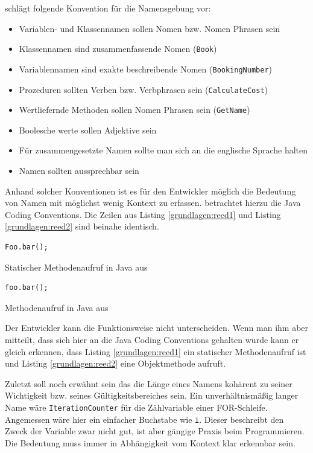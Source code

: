 \cite[S. 4]{Green} schlägt folgende Konvention für die Namensgebung vor:
\begin{itemize}
	\item Variablen- und Klassennamen sollen Nomen bzw. Nomen Phrasen sein
	\item Klassennamen sind zusammenfassende Nomen (\texttt{Book})
	\item Variablennamen sind exakte beschreibende Nomen (\texttt{BookingNumber})
	\item Prozeduren sollten Verben bzw. Verbphrasen sein (\texttt{CalculateCost})
	\item Wertliefernde Methoden sollen Nomen Phrasen sein (\texttt{GetName}) 
	\item Boolesche werte sollen Adjektive sein
	\item Für zusammengesetzte Namen sollte man sich an die englische Sprache halten
	\item Namen sollten aussprechbar sein
\end{itemize}

Anhand solcher Konventionen ist es für den Entwickler möglich die Bedeutung von Namen mit möglichst wenig Kontext zu erfassen.
\cite{reed} betrachtet hierzu die Java Coding Conventions. Die Zeilen aus Listing \ref{grundlagen:reed1} und
Listing \ref{grundlagen:reed2} sind beinahe identisch. 

\begin{listing}
    \begin{verbatim}
Foo.bar();
    \end{verbatim}
    \caption{Statischer Methodenaufruf in Java aus \cite[S. 182]{reed}}
    \label{grundlagen:reed1}
\end{listing}

\begin{listing}
    \begin{verbatim}
foo.bar();
    \end{verbatim}
    \caption{Methodenaufruf in Java aus \cite[S. 182]{reed}}
    \label{grundlagen:reed2}
\end{listing}

Der Entwickler kann die Funktionsweise nicht unterscheiden.
Wenn man ihm aber mitteilt, dass sich hier an die Java Coding Conventions gehalten wurde kann er gleich erkennen,
dass Listing \ref{grundlagen:reed1} ein statischer Methodenaufruf ist und
Listing \ref{grundlagen:reed2} eine Objektmethode aufruft.

Zuletzt soll noch erwähnt sein das die Länge eines Namens kohärent zu seiner Wichtigkeit bzw. seines Gültigkeitsbereiches sein.
Ein unverhältnismäßig langer Name wäre \texttt{IterationCounter} für die Zählvariable einer FOR-Schleife. Angemessen wäre hier ein einfacher Buchstabe wie \texttt{i}. Dieser beschreibt den Zweck der Variable zwar nicht gut, ist aber gängige Praxis beim Programmieren. Die Bedeutung muss immer in Abhängigkeit vom Kontext klar erkennbar sein.



